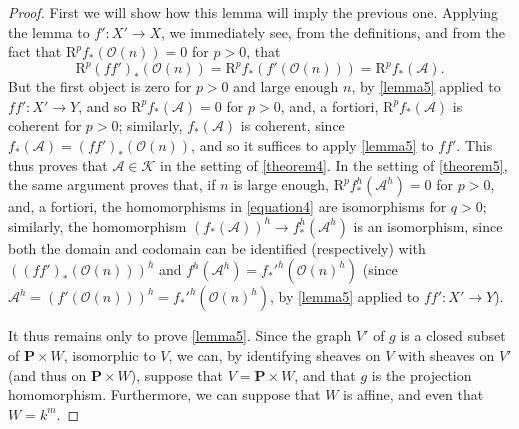 \documentclass{article}
\theoremstyle{plain}
\theoremstyle{definition}
\newcommand{\sh}[1]{{\mathscr{#1}}}
\newcommand{\cat}[1]{{\mathcal{#1}}}
\newcommand{\RR}{\mathrm{R}}
\newcommand{\oldpage}[1]{\marginpar{\footnotesize$\Big\vert$ \textit{p.~#1}}}
\begin{document}
\begin{proof}
  First we will show how this lemma will imply the previous one.
  Applying the lemma to $f'\colon X'\to X$, we immediately see, from the definitions, and from the fact that $\RR^pf_*(\sh{O}(n))=0$ for $p>0$, that
  \[
    \RR^p(ff')_*(\sh{O}(n)) = \RR^pf_*(f'(\sh{O}(n))) = \RR^pf_*(\sh{A}).
  \]
\oldpage{2-12}
  But the first object is zero for $p>0$ and large enough $n$, by \cref{lemma5} applied to $ff'\colon X'\to Y$, and so $\RR^pf_*(\sh{A})=0$ for $p>0$, and, a fortiori, $\RR^pf_*(\sh{A})$ is coherent for $p>0$;
  similarly, $f_*(\sh{A})$ is coherent, since $f_*(\sh{A})=(ff')_*(\sh{O}(n))$, and so it suffices to apply \cref{lemma5} to $ff'$.
  This thus proves that $\sh{A}\in\cat{K}$ in the setting of \cref{theorem4}.
  In the setting of \cref{theorem5}, the same argument proves that, if $n$ is large enough, $\RR^pf_*^h(\sh{A}^h)=0$ for $p>0$, and, a fortiori, the homomorphisms in \cref{equation4} are isomorphisms for $q>0$;
  similarly, the homomorphism $(f_*(\sh{A}))^h\to f_*^h(\sh{A}^h)$ is an isomorphism, since both the domain and codomain can be identified (respectively) with $((ff')_*(\sh{O}(n)))^h$ and $f^h(\sh{A}^h)=f_*'^h(\sh{O}(n)^h)$ (since $\sh{A}^h=(f'(\sh{O}(n)))^h=f_*'^h(\sh{O}(n)^h)$, by \cref{lemma5} applied to $ff'\colon X'\to Y$).

  It thus remains only to prove \cref{lemma5}.
  Since the graph $V'$ of $g$ is a closed subset of $\mathbf{P}\times W$, isomorphic to $V$, we can, by identifying sheaves on $V$ with sheaves on $V'$ (and thus on $\mathbf{P}\times W$), suppose that $V=\mathbf{P}\times W$, and that $g$ is the projection homomorphism.
  Furthermore, we can suppose that $W$ is affine, and even that $W=k^m$.


\end{proof}
\end{document}
